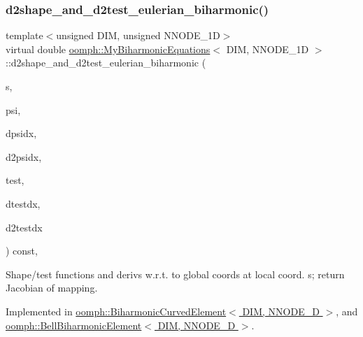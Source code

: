 \subsubsection{\texorpdfstring{d2shape\+\_\+and\+\_\+d2test\+\_\+eulerian\+\_\+biharmonic()}{d2shape\_and\_d2test\_eulerian\_biharmonic()}\hspace{0.1cm}{\footnotesize\ttfamily [2/2]}}
{\footnotesize\ttfamily template$<$unsigned D\+IM, unsigned N\+N\+O\+D\+E\+\_\+1D$>$ \\
virtual double \hyperlink{classoomph_1_1MyBiharmonicEquations}{oomph\+::\+My\+Biharmonic\+Equations}$<$ D\+IM, N\+N\+O\+D\+E\+\_\+1D $>$\+::d2shape\+\_\+and\+\_\+d2test\+\_\+eulerian\+\_\+biharmonic (\begin{DoxyParamCaption}\item[{const Vector$<$ double $>$ \&}]{s,  }\item[{Shape \&}]{psi,  }\item[{D\+Shape \&}]{dpsidx,  }\item[{D\+Shape \&}]{d2psidx,  }\item[{Shape \&}]{test,  }\item[{D\+Shape \&}]{dtestdx,  }\item[{D\+Shape \&}]{d2testdx }\end{DoxyParamCaption}) const\hspace{0.3cm}{\ttfamily [protected]}, {}}



Shape/test functions and derivs w.\+r.\+t. to global coords at local coord. s; return Jacobian of mapping. 



Implemented in \hyperlink{classoomph_1_1BiharmonicCurvedElement_aabae0edfbfa93f138e7a2c6421dfcfcd}{oomph\+::\+Biharmonic\+Curved\+Element$<$ D\+I\+M, N\+N\+O\+D\+E\+\_\+D $>$}, and \hyperlink{classoomph_1_1BellBiharmonicElement_af26cb1e9c4980ae4b0911238820f6ae1}{oomph\+::\+Bell\+Biharmonic\+Element$<$ D\+I\+M, N\+N\+O\+D\+E\+\_\+D $>$}.

\mbox{\label{classoomph_1_1MyBiharmonicEquations_a08e45fddb2c25119e6ba826cd6cafdbf}} 
